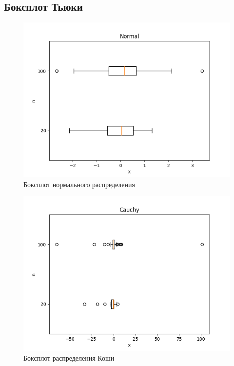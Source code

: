 \subsection{Боксплот Тьюки}

\begin{figure}[H]
	\centering
	\includegraphics[scale=0.65]{normal_boxplot.png}
	\caption{Боксплот нормального распределения}
\end{figure}

\begin{figure}[H]
	\centering
	\includegraphics[scale=0.65]{cauchy_boxplot.png}
	\caption{Боксплот распределения Коши}
\end{figure}

